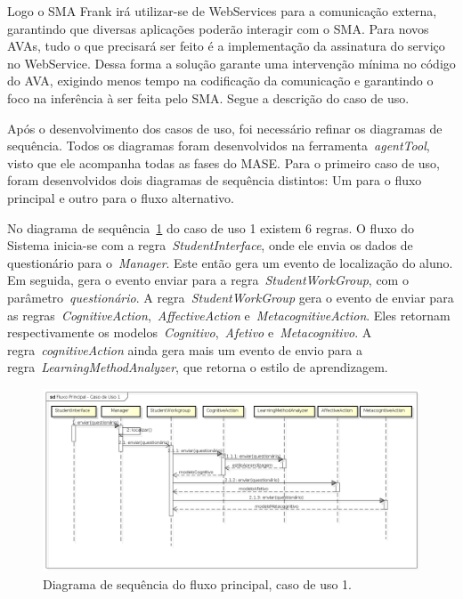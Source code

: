 Logo o SMA Frank irá utilizar-se de WebServices para a comunicação externa, garantindo que diversas aplicações poderão interagir com o SMA. Para novos AVAs, tudo o que precisará ser feito é a implementação da assinatura do serviço no WebService. Dessa forma a solução garante uma intervenção mínima no código do AVA, exigindo menos tempo na codificação da comunicação e garantindo o foco na inferência à ser feita pelo SMA. Segue a descrição do caso de uso.

Após o desenvolvimento dos casos de uso, foi necessário refinar os diagramas de sequência. Todos os diagramas foram desenvolvidos na ferramenta~\emph{agentTool}, visto que ele acompanha todas as fases do MASE. Para o primeiro caso de uso, foram desenvolvidos dois diagramas de sequência distintos: Um para o fluxo principal e outro para o fluxo alternativo.

No diagrama de sequência~\ref{fig:dss-uc1-fluxo-principal} do caso de uso 1 existem 6 regras. O fluxo do Sistema inicia-se com a regra~\emph{StudentInterface}, onde ele envia os dados de questionário para o~\emph{Manager}. Este então gera um evento de localização do aluno. Em seguida, gera o evento enviar para a regra~\emph{StudentWorkGroup}, com o parâmetro~\emph{questionário}. A regra~\emph{StudentWorkGroup} gera o evento de enviar para as regras~\emph{CognitiveAction},~\emph{AffectiveAction} e~\emph{MetacognitiveAction}. Eles retornam respectivamente os modelos~\emph{Cognitivo},~\emph{Afetivo} e~\emph{Metacognitivo}. A regra~\emph{cognitiveAction} ainda gera mais um evento de envio para a regra~\emph{LearningMethodAnalyzer}, que retorna o estilo de aprendizagem.

\begin{figure}
	\centering
	\includegraphics[scale=0.48]{images/dss-uc1-fluxo-principal.png}
	\caption{Diagrama de sequência do fluxo principal, caso de uso 1.}
	\label{fig:dss-uc1-fluxo-principal}
\end{figure}

